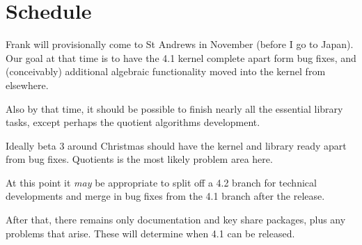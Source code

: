 \documentclass[12pt]{article}
\begin{document}
\section{Schedule}

Frank will provisionally come to St Andrews in November (before I go
to Japan). Our goal at that time is to have the 4.1 kernel complete apart
form bug fixes, and (conceivably) additional algebraic functionality
moved into the kernel from elsewhere.  

Also by that time, it should be possible to finish nearly all the
essential library tasks, except perhaps the quotient algorithms
development.

Ideally beta 3 around Christmas should have the kernel and library
ready apart from bug fixes. Quotients is the most likely problem area here.

At this point it \emph{may} be appropriate to split off a 4.2 branch for
technical developments and merge in bug fixes from the 4.1 branch
after the release.

After that, there remains only documentation and key share packages,
plus any problems that arise. These will determine when 4.1 can
be released.
\end{document}
